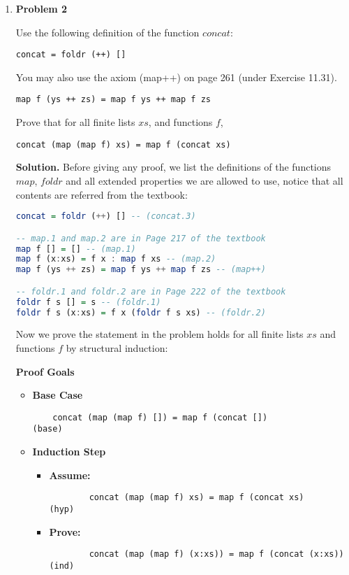 \documentclass[11pt]{article}
\theoremstyle{definition}
\begin{document}
\begin{enumerate} \itemsep 20pt

\item[] \textbf{Problem 2}

Use the following definition of the function $concat$:
\begin{verbatim}
concat = foldr (++) []
\end{verbatim}
You may also use the axiom (map++) on page 261 (under Exercise 11.31).
\begin{verbatim}
map f (ys ++ zs) = map f ys ++ map f zs
\end{verbatim}
Prove that for all finite lists $xs$, and functions $f$,
\begin{verbatim}
concat (map (map f) xs) = map f (concat xs)
\end{verbatim}

\textbf{Solution.} Before giving any proof, we list the definitions of the functions
$map$, $foldr$ and all extended properties we are allowed to use, notice that all contents
are referred from the textbook:
\begin{lstlisting}[language=Haskell]
concat = foldr (++) [] -- (concat.3)

-- map.1 and map.2 are in Page 217 of the textbook
map f [] = [] -- (map.1)
map f (x:xs) = f x : map f xs -- (map.2)
map f (ys ++ zs) = map f ys ++ map f zs -- (map++)

-- foldr.1 and foldr.2 are in Page 222 of the textbook
foldr f s [] = s -- (foldr.1)
foldr f s (x:xs) = f x (foldr f s xs) -- (foldr.2)
\end{lstlisting}

Now we prove the statement in the problem holds for all finite lists $xs$ and functions $f$ by structural induction:

\textbf{Proof Goals}
\begin{itemize}
  \item \textbf{Base Case}
  	\begin{verbatim}
  	concat (map (map f) []) = map f (concat [])                     (base)
	\end{verbatim}
	\item \textbf{Induction Step}
		\begin{itemize}
		\item \textbf{Assume:}
		\begin{verbatim}
		concat (map (map f) xs) = map f (concat xs)                     (hyp)
		\end{verbatim}
		\item \textbf{Prove:}
		\begin{verbatim}
		concat (map (map f) (x:xs)) = map f (concat (x:xs))            (ind)
		\end{verbatim}
		\end{itemize}
\end{itemize}


\end{enumerate}
\end{document}
